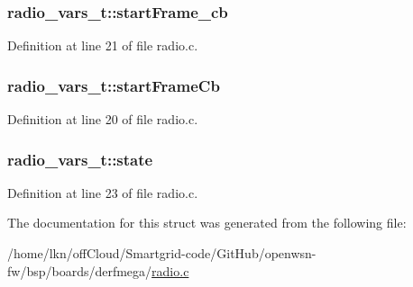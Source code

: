 \subsubsection[{\texorpdfstring{start\+Frame\+\_\+cb}{startFrame_cb}}]{ radio\+\_\+vars\+\_\+t\+::start\+Frame\+\_\+cb}\hypertarget{structradio__vars__t_a93a9acd7ac9beef0cdfdaa1d0c12a1e4}{}\label{structradio__vars__t_a93a9acd7ac9beef0cdfdaa1d0c12a1e4}


Definition at line 21 of file radio.\+c.

\subsubsection[{\texorpdfstring{start\+Frame\+Cb}{startFrameCb}}]{ radio\+\_\+vars\+\_\+t\+::start\+Frame\+Cb}\hypertarget{structradio__vars__t_afa3b09ad5194f3dec3367efd63a3d0b7}{}\label{structradio__vars__t_afa3b09ad5194f3dec3367efd63a3d0b7}


Definition at line 20 of file radio.\+c.

\subsubsection[{\texorpdfstring{state}{state}}]{ radio\+\_\+vars\+\_\+t\+::state}\hypertarget{structradio__vars__t_a87f9e4910ac07bd530ec35fe2580d44c}{}\label{structradio__vars__t_a87f9e4910ac07bd530ec35fe2580d44c}


Definition at line 23 of file radio.\+c.



The documentation for this struct was generated from the following file\+:\begin{DoxyCompactItemize}
\item 
/home/lkn/off\+Cloud/\+Smartgrid-\/code/\+Git\+Hub/openwsn-\/fw/bsp/boards/derfmega/\hyperlink{boards_2derfmega_2radio_8c}{radio.\+c}\end{DoxyCompactItemize}
